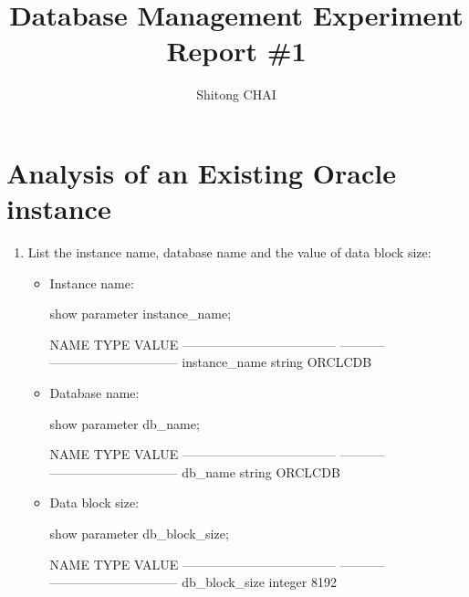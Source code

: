 \documentclass{article}
\title{Database Management Experiment Report \#1}
\author{Shitong CHAI}
\date{\vspace{-5ex}}
\begin{document}
\maketitle

\section{Analysis of an Existing Oracle instance}

\begin{enumerate}


\item List the instance name, database name and the value of data block size:


\begin{itemize}

\item Instance name:
\begin{sqlshell}
show parameter instance_name;
\end{sqlshell}

\begin{messageshell}

NAME                                 TYPE        VALUE
------------------------------------ ----------- ------------------------------
instance_name                        string      ORCLCDB

\end{messageshell}

\item Database name:
\begin{sqlshell}
show parameter db_name;
\end{sqlshell}

\begin{messageshell}
NAME                                 TYPE        VALUE
------------------------------------ ----------- ------------------------------
db_name                              string      ORCLCDB
\end{messageshell}

\item Data block size:
\begin{sqlshell}
show parameter db_block_size;
\end{sqlshell}
\begin{messageshell}
      
NAME                                 TYPE        VALUE
------------------------------------ ----------- ------------------------------
db_block_size                        integer     8192


\end{messageshell}
\end{itemize}
\end{enumerate}
\end{document}
